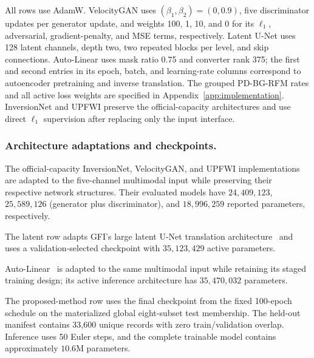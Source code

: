 All rows use AdamW. VelocityGAN uses $(\beta_1,\beta_2)=(0,0.9)$, five discriminator updates per generator update, and weights 100, 1, 10, and 0 for its $\ell_1$, adversarial, gradient-penalty, and MSE terms, respectively. Latent U-Net uses 128 latent channels, depth two, two repeated blocks per level, and skip connections. Auto-Linear uses mask ratio 0.75 and converter rank 375; the first and second entries in its epoch, batch, and learning-rate columns correspond to autoencoder pretraining and inverse translation. The grouped PD-BG-RFM rates and all active loss weights are specified in Appendix~\ref{app:implementation}. InversionNet and UPFWI preserve the official-capacity architectures and use direct $\ell_1$ supervision after replacing only the input interface.

\subsubsection{Architecture adaptations and checkpoints.}
The official-capacity InversionNet, VelocityGAN, and UPFWI implementations are adapted to the five-channel multimodal input while preserving their respective network structures. Their evaluated models have $24{,}409{,}123$, $25{,}589{,}126$ (generator plus discriminator), and $18{,}996{,}259$ reported parameters, respectively.

The latent row adapts GFI's large latent U-Net translation architecture~\cite{gupta2025gfi} and uses a validation-selected checkpoint with $35{,}123{,}429$ active parameters.

Auto-Linear~\cite{feng2024autolinear} is adapted to the same multimodal input while retaining its staged training design; its active inference architecture has $35{,}470{,}032$ parameters.

The proposed-method row uses the final checkpoint from the fixed 100-epoch schedule on the materialized global eight-subset test membership. The held-out manifest contains 33,600 unique records with zero train/validation overlap. Inference uses 50 Euler steps, and the complete trainable model contains approximately $10.6$M parameters.

